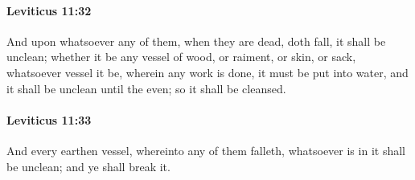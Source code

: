 		\paragraph{Leviticus 11:32} %
			\label{LEVITICUS-11-32}

			And upon whatsoever any of them, when they are dead, doth fall, it shall be unclean; whether it be any vessel of wood, or raiment, or skin, or sack, whatsoever vessel it be, wherein any work is done, it must be put into water, and it shall be unclean until the even; so it shall be cleansed.


		\paragraph{Leviticus 11:33} %
			\label{LEVITICUS-11-33}

			And every earthen vessel, whereinto any of them falleth, whatsoever is in it shall be unclean; and ye shall break it.

